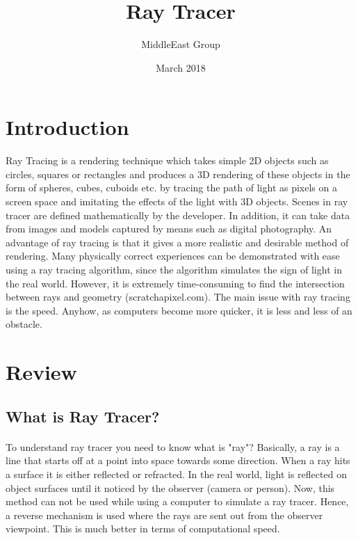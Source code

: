 \documentclass{article}
\title{Ray Tracer}
\author{MiddleEast Group }
\date{March 2018}
\begin{document}
\maketitle 

\section{Introduction}

Ray Tracing is a rendering technique which takes simple 2D objects such as circles, squares or rectangles and
produces a 3D rendering of these objects in the form of spheres, cubes, cuboids etc.  by tracing the path of light as pixels on a screen space and imitating the effects of the light with 3D objects. Scenes in ray tracer are defined mathematically by the developer. In addition, it can take data from images and models captured by means such as digital photography. \newline An advantage of ray tracing is that it gives a more realistic and desirable method of rendering. Many physically correct experiences can be demonstrated with ease using a ray tracing algorithm, since the algorithm simulates the sign of light in the real world.
However, it is extremely time-consuming to find the intersection between rays and geometry (scratchapixel.com). The main issue with ray tracing is the speed. Anyhow, as computers become more quicker, it is less and less of an obstacle. 

\section{Review}
\subsection{What is Ray Tracer?}

\paragraph{}
To understand ray tracer you need to know what is "ray"? Basically, a ray is a line that starts off at a point into space towards some direction. When a ray hits a surface it is either reflected or refracted.
In the real world, light is reflected on object surfaces until it noticed by the observer (camera or person). \newline Now, this method can not be used while using a computer to simulate a ray tracer. Hence, a reverse mechanism is used where the rays are sent out from the observer viewpoint. This is much better in terms of computational speed. 
\end{document}
